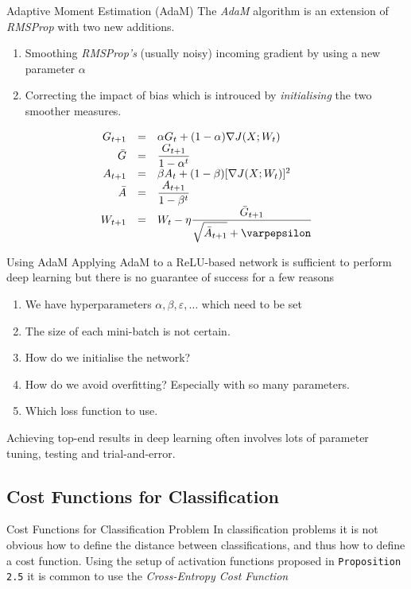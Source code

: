 \documentclass[11pt,a4paper]{article}
\begin{document}
  \begin{proposition}{Adaptive Moment Estimation (AdaM)}
    The \textit{AdaM} algorithm is an extension of \textit{RMSProp} with two new additions.
    \begin{enumerate}
      \item Smoothing \textit{RMSProp's} (usually noisy) incoming gradient by using a new parameter $\alpha$
      \item Correcting the impact of bias which is introuced by \textit{initialising} the two smoother measures.
    \end{enumerate}
    \[\begin{array}{rcl}
      G_{t+1}&=&\alpha G_t+(1-\alpha)\nabla J(X;W_t)\\
      \bar{G}&=&\dfrac{G_{t+1}}{1-\alpha^t}\\
      A_{t+1}&=&\beta A_t+(1-\beta)[\nabla J(X;W_t)]^2\\
      \bar{A}&=&\dfrac{A_{t+1}}{1-\beta^t}\\
      W_{t+1}&=&W_t-\eta\dfrac{\bar{G}_{t+1}}{\sqrt{\bar{A}_{t+1}}+\varpepsilon}
    \end{array}\]
  \end{proposition}

  \begin{remark}{Using AdaM}
    Applying AdaM to a ReLU-based network is sufficient to perform deep learning but there is no guarantee of success for a few reasons
    \begin{enumerate}
      \item We have hyperparameters $\alpha,\beta,\varepsilon,\dots$ which need to be set
      \item The size of each mini-batch is not certain.
      \item How do we initialise the network?
      \item How do we avoid overfitting? Especially with so many parameters.
      \item Which loss function to use.
    \end{enumerate}
    Achieving top-end results in deep learning often involves lots of parameter tuning, testing and trial-and-error.
  \end{remark}

\subsection{Cost Functions for Classification}

  \begin{remark}{Cost Functions for Classification Problem}
    In classification problems it is not obvious how to define the distance between classifications, and thus how to define a cost function. Using the setup of activation functions proposed in \texttt{Proposition 2.5} it is common to use the \textit{Cross-Entropy Cost Function}
  \end{remark}
\end{document}

